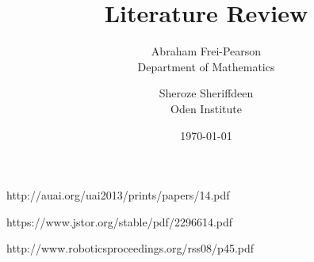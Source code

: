 \documentclass{article}
\title{Literature Review}
\author{Abraham Frei-Pearson \\
	Department of Mathematics  \\
	\and 
	Sheroze Sheriffdeen \\
	Oden Institute \\
	}
\date{\today}
\begin{document}
\maketitle

http://auai.org/uai2013/prints/papers/14.pdf

https://www.jstor.org/stable/pdf/2296614.pdf

http://www.roboticsproceedings.org/rss08/p45.pdf


 

\end{document}
